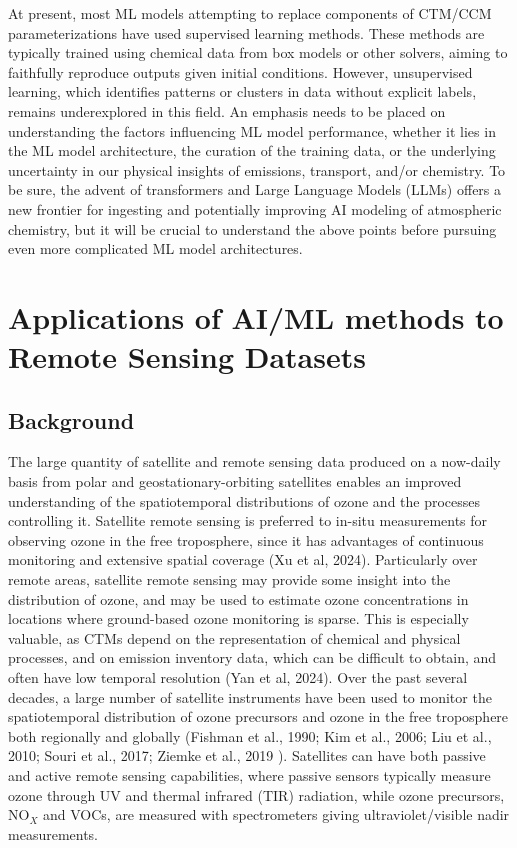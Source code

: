 \documentclass[gmd, manuscript]{copernicus}
\begin{document}
At present, most ML models attempting to replace components of CTM/CCM parameterizations have used supervised learning methods. These methods are typically trained using chemical data from box models or other solvers, aiming to faithfully reproduce outputs given initial conditions. However, unsupervised learning, which identifies patterns or clusters in data without explicit labels, remains underexplored in this field. An emphasis needs to be placed on understanding the factors influencing ML model performance, whether it lies in the ML model architecture, the curation of the training data, or the underlying uncertainty in our physical insights of emissions, transport, and/or chemistry. To be sure, the advent of transformers and Large Language Models (LLMs) offers a new frontier for ingesting and potentially improving AI modeling of atmospheric chemistry, but it will be crucial to understand the above points before pursuing even more complicated ML model architectures.


\section{Applications of AI/ML methods to Remote Sensing Datasets}


\subsection{Background}
The large quantity of satellite and remote sensing data produced on a now-daily basis from polar and geostationary-orbiting satellites enables an improved understanding of the spatiotemporal distributions of ozone and the processes controlling it. Satellite remote sensing is preferred to in-situ measurements for observing ozone in the free troposphere, since it has advantages of continuous monitoring and extensive spatial coverage (Xu et al, 2024). Particularly over remote areas, satellite remote sensing may provide some insight into the distribution of ozone, and may be used to estimate ozone concentrations in locations where ground-based ozone monitoring is sparse. This is especially valuable, as CTMs depend on the representation of chemical and physical processes, and on emission inventory data, which can be difficult to obtain, and often have low temporal resolution (Yan et al, 2024). Over the past several decades, a large number of satellite instruments have been used to monitor the spatiotemporal distribution of ozone precursors and ozone in the free troposphere both regionally and globally (Fishman et al., 1990; Kim et al., 2006; Liu et al., 2010; Souri et al., 2017; Ziemke et al., 2019 ). Satellites can have both passive and active remote sensing capabilities, where passive sensors typically measure ozone through UV and thermal infrared (TIR) radiation, while ozone precursors, NO$_X$ and VOCs, are measured with spectrometers giving ultraviolet/visible nadir measurements. 
\end{document}
